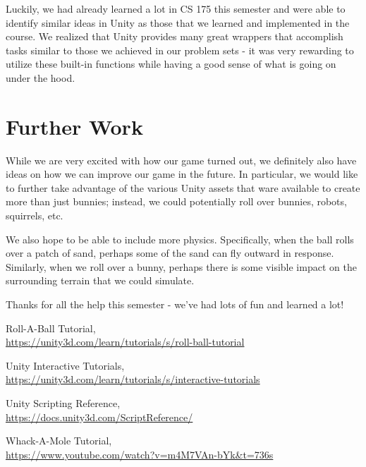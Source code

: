 \documentclass[12pt]{article}
\begin{document}
Luckily, we had already learned a lot in CS 175 this semester and were able to identify similar ideas in Unity as those that we learned and implemented in the course. We realized that Unity provides many great wrappers that accomplish tasks similar to those we achieved in our problem sets - it was very rewarding to utilize these built-in functions while having a good sense of what is going on under the hood.


\section{Further Work}
While we are very excited with how our game turned out, we definitely also have ideas on how we can improve our game in the future. In particular, we would like to further take advantage of the various Unity assets that ware available to create more than just bunnies; instead, we could potentially roll over bunnies, robots, squirrels, etc. 

We also hope to be able to include more physics. Specifically, when the ball rolls over a patch of sand, perhaps some of the sand can fly outward in response. Similarly, when we roll over a bunny, perhaps there is some visible impact on the surrounding terrain that we could simulate. 

\vspace{1in}
Thanks for all the help this semester - we've had lots of fun and learned a lot!



\begin{thebibliography}{999}

    Roll-A-Ball Tutorial, \\
    \url{https://unity3d.com/learn/tutorials/s/roll-ball-tutorial}

    Unity Interactive Tutorials, \\
    \url{https://unity3d.com/learn/tutorials/s/interactive-tutorials}

    Unity Scripting Reference, \\
    \url{https://docs.unity3d.com/ScriptReference/}

    Whack-A-Mole Tutorial, \\
    \url{https://www.youtube.com/watch?v=m4M7VAn-bYk&t=736s}

  \end{thebibliography}
\end{document}

